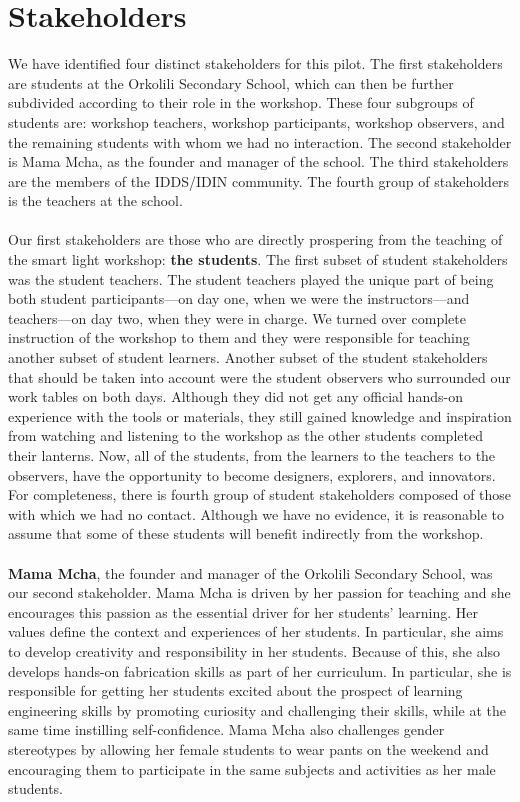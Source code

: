 \documentclass[11pt, twocolumn]{article}
\begin{document}
\section*{Stakeholders}
We have identified four distinct stakeholders for this pilot. The first stakeholders are students at the Orkolili Secondary School, which can then be further subdivided according to their role in the workshop. These four subgroups of students are: workshop teachers, workshop participants, workshop observers, and the remaining students with whom we had no interaction. The second stakeholder is Mama Mcha, as the founder and manager of the school. The third stakeholders are the members of the IDDS/IDIN community. The fourth group of stakeholders is the teachers at the school.\ \\
\ \\
Our first stakeholders are those who are directly prospering from the teaching of the smart light workshop: \textbf{the students}. The first subset of student stakeholders was the student teachers. The student teachers played the unique part of being both student participants—on day one, when we were the instructors—and teachers—on day two, when they were in charge. We turned over complete instruction of the workshop to them and they were responsible for teaching another subset of student learners. Another subset of the student stakeholders that should be taken into account were the student observers who surrounded our work tables on both days. Although they did not get any official hands-on experience with the tools or materials, they still gained knowledge and inspiration from watching and listening to the workshop as the other students completed their lanterns. Now, all of the students, from the learners to the teachers to the observers, have the opportunity to become designers, explorers, and innovators. For completeness, there is fourth group of student stakeholders composed of those with which we had no contact. Although we have no evidence, it is reasonable to assume that some of these students will benefit indirectly from the workshop.\ \\
\ \\
\textbf{Mama Mcha}, the founder and manager of the Orkolili Secondary School, was our second stakeholder. Mama Mcha is driven by her passion for teaching and she encourages this passion as the essential driver for her students’ learning. Her values define the context and experiences of her students. In particular, she aims to develop creativity and responsibility in her students. Because of this, she also develops hands-on fabrication skills as part of her curriculum. In particular, she is responsible for getting her students excited about the prospect of learning engineering skills by promoting curiosity and challenging their skills, while at the same time instilling self-confidence. Mama Mcha also challenges gender stereotypes by allowing her female students to wear pants on the weekend and encouraging them to participate in the same subjects and activities as her male students.\ \\
\end{document}
